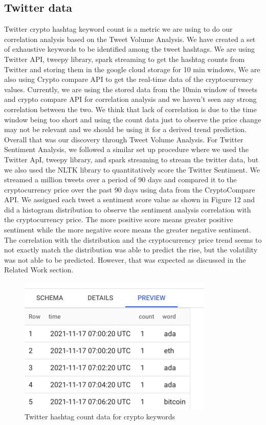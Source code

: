 \documentclass[final]{cvpr}
\begin{document}
\subsection{Twitter data}
Twitter crypto hashtag keyword count is a metric we are using to do our correlation analysis based on the Tweet Volume Analysis.  We have created a set of exhaustive keywords to be identified among the tweet hashtags. We are using Twitter API, tweepy library, spark streaming to get the hashtag counts from Twitter and storing them in the google cloud storage for 10 min windows, We are also using Crypto compare API to get the real-time data of the cryptocurrency values. Currently, we are using the stored data from the 10min window of tweets and crypto compare API for correlation analysis and we haven't seen any strong correlation between the two. We think that lack of correlation is due to the time window being too short and using the count data just to observe the price change may not be relevant and we should be using it for a derived trend prediction. Overall that was our discovery through Tweet Volume Analysis. For Twitter Sentiment Analysis, we followed a similar set up procedure where we used the Twitter ApI, tweepy library, and spark streaming to stream the twitter data, but we also used the NLTK library to quantitatively score the Twitter Sentiment. We streamed a million tweets over a period of 90 days and compared it to the cryptocurrency price over the past 90 days using data from the CryptoCompare API. We assigned each tweet a sentiment score value as shown in Figure 12 and did a histogram distribution to observe the sentiment analysis correlation with the cryptocurrency price. The more positive score means greater positive sentiment while the more negative score means the greater negative sentiment. The correlation with the distribution and the cryptocurrency price trend seems to not exactly match the distribution was able to predict the rise, but the volatility was not able to be predicted. However, that was expected as discussed in the Related Work section. 

\begin{figure}[h!]
\begin{center}
\includegraphics[width=0.8\linewidth]{latex/twitter.png}
\end{center}
   \caption{Twitter hashtag count data for crypto keywords}
\label{fig:long}
\label{fig:onecol}
\end{figure}
\end{document}

